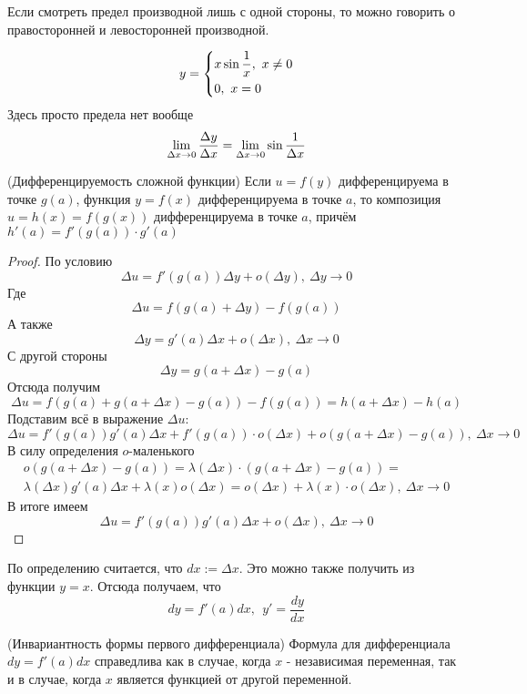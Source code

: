 \begin{note}
	Если смотреть предел производной лишь с одной стороны, то можно говорить о правосторонней и левосторонней производной.
\end{note}

\begin{example}
	$$
		y = \left\{\begin{aligned}&{x \sin \frac{1}{x},\ x \neq 0} \\ &{0,\ x = 0}\end{aligned}\right.
	$$
	Здесь просто предела нет вообще
	$$
		\lim\limits_{\Delta x \to 0} \frac{\Delta y}{\Delta x} = \lim\limits_{\Delta x \to 0} \sin \frac{1}{\Delta x}
	$$
\end{example}

\begin{theorem} (Дифференцируемость сложной функции)
	Если $u = f(y)$ дифференцируема в точке $g(a)$, функция $y = f(x)$ дифференцируема в точке $a$, то композиция $u = h(x) = f(g(x))$ дифференцируема в точке $a$, причём $h'(a) = f'(g(a)) \cdot g'(a)$
\end{theorem}

\begin{proof}
	По условию
	$$
		\Delta u = f'(g(a))\Delta y + o(\Delta y),\ \Delta y \to 0
	$$
	Где 
	$$
		\Delta u = f(g(a) + \Delta y) - f(g(a))
	$$
	А также
	$$
		\Delta y = g'(a)\Delta x + o(\Delta x),\ \Delta x \to 0
	$$
	С другой стороны
	$$
		\Delta y = g(a + \Delta x) - g(a)
	$$
	Отсюда получим
	$$
		\Delta u = f(g(a) + g(a + \Delta x) - g(a)) - f(g(a)) = h(a + \Delta x) - h(a)
	$$
	Подставим всё в выражение $\Delta u$:
	$$
		\Delta u = f'(g(a))g'(a)\Delta x + f'(g(a)) \cdot o(\Delta x) + o(g(a + \Delta x) - g(a)),\ \Delta x \to 0
	$$
	В силу определения $o$-маленького
	\begin{multline*}
		o(g(a + \Delta x) - g(a)) = \lambda(\Delta x) \cdot \left(g(a + \Delta x) - g(a)\right) = \\
		\lambda(\Delta x)g'(a)\Delta x + \lambda(x)o(\Delta x) = o(\Delta x) + \lambda(x) \cdot o(\Delta x),\ \Delta x \to 0
	\end{multline*}
	В итоге имеем
	$$
		\Delta u = f'(g(a))g'(a)\Delta x + o(\Delta x),\ \Delta x \to 0
	$$
\end{proof}

\begin{note}
	По определению считается, что $dx := \Delta x$. Это можно также получить из функции $y = x$. Отсюда получаем, что
	$$
		dy = f'(a)dx,\ \ y' = \frac{dy}{dx} 
	$$
\end{note}

\begin{corollary} (Инвариантность формы первого дифференциала)
	Формула для дифференциала $dy = f'(a)dx$ справедлива как в случае, когда $x$ - независимая переменная, так и в случае, когда $x$ является функцией от другой переменной.
\end{corollary}

